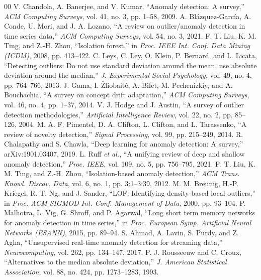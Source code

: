 \documentclass[conference]{IEEEtran}
\begin{document}
\begin{thebibliography}{00}
 V. Chandola, A. Banerjee, and V. Kumar, ``Anomaly detection: A survey,'' \emph{ACM Computing Surveys}, vol. 41, no. 3, pp. 1--58, 2009.
 A. Bl\'azquez-Garc\'ia, A. Conde, U. Mori, and J. A. Lozano, ``A review on outlier/anomaly detection in time series data,'' \emph{ACM Computing Surveys}, vol. 54, no. 3, 2021.
 F. T. Liu, K. M. Ting, and Z.-H. Zhou, ``Isolation forest,'' in \emph{Proc. IEEE Int. Conf. Data Mining (ICDM)}, 2008, pp. 413--422.
 C. Leys, C. Ley, O. Klein, P. Bernard, and L. Licata, ``Detecting outliers: Do not use standard deviation around the mean, use absolute deviation around the median,'' \emph{J. Experimental Social Psychology}, vol. 49, no. 4, pp. 764--766, 2013.
 J. Gama, I. \v{Z}liobait\.{e}, A. Bifet, M. Pechenizkiy, and A. Bouchachia, ``A survey on concept drift adaptation,'' \emph{ACM Computing Surveys}, vol. 46, no. 4, pp. 1--37, 2014.
 V. J. Hodge and J. Austin, ``A survey of outlier detection methodologies,'' \emph{Artificial Intelligence Review}, vol. 22, no. 2, pp. 85--126, 2004.
 M. A. F. Pimentel, D. A. Clifton, L. Clifton, and L. Tarassenko, ``A review of novelty detection,'' \emph{Signal Processing}, vol. 99, pp. 215--249, 2014.
 R. Chalapathy and S. Chawla, ``Deep learning for anomaly detection: A survey,'' arXiv:1901.03407, 2019.
 L. Ruff \emph{et al.}, ``A unifying review of deep and shallow anomaly detection,'' \emph{Proc. IEEE}, vol. 109, no. 5, pp. 756--795, 2021.
 F. T. Liu, K. M. Ting, and Z.-H. Zhou, ``Isolation-based anomaly detection,'' \emph{ACM Trans. Knowl. Discov. Data}, vol. 6, no. 1, pp. 3:1--3:39, 2012.
 M. M. Breunig, H.-P. Kriegel, R. T. Ng, and J. Sander, ``LOF: Identifying density-based local outliers,'' in \emph{Proc. ACM SIGMOD Int. Conf. Management of Data}, 2000, pp. 93--104.
 P. Malhotra, L. Vig, G. Shroff, and P. Agarwal, ``Long short term memory networks for anomaly detection in time series,'' in \emph{Proc. European Symp. Artificial Neural Networks (ESANN)}, 2015, pp. 89--94.
 S. Ahmad, A. Lavin, S. Purdy, and Z. Agha, ``Unsupervised real-time anomaly detection for streaming data,'' \emph{Neurocomputing}, vol. 262, pp. 134--147, 2017.
 P. J. Rousseeuw and C. Croux, ``Alternatives to the median absolute deviation,'' \emph{J. American Statistical Association}, vol. 88, no. 424, pp. 1273--1283, 1993.

\end{thebibliography}
\end{document}
